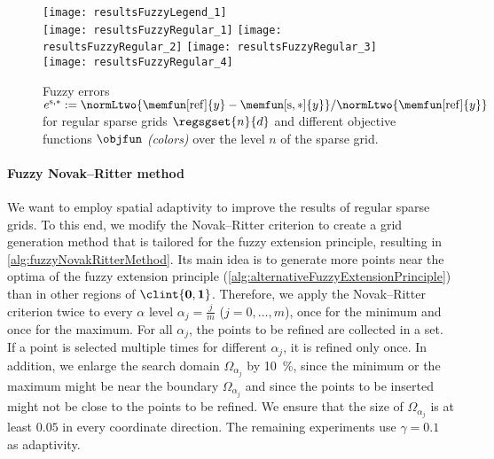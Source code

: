 \begin{figure}
  \texttt{[image: resultsFuzzyLegend\_1]}\\[2mm]%
  \texttt{[image: resultsFuzzyRegular\_1]}%
  \hfill%
  \texttt{[image: resultsFuzzyRegular\_2]}%
  \hfill%
  \texttt{[image: resultsFuzzyRegular\_3]}%
  \hfill%
  \texttt{[image: resultsFuzzyRegular\_4]}%
  \caption[Fuzzy errors for regular sparse grids]{%
    Fuzzy errors
    $e^{\sparse,\ast}
    := \normLtwo{\memfun[\reference]{y} - \memfun[\sparse,\ast]{y}}/
    \normLtwo{\memfun[\reference]{y}}$
    for regular sparse grids $\regsgset{n}{d}$
    and different objective functions $\objfun$ \emph{(colors)}
    over the level $n$ of the sparse grid.%
  }%
  \label{fig:resultsFuzzyRegular}%
\end{figure}

\paragraph{Fuzzy Novak--Ritter method}

We want to employ spatial adaptivity to improve the results
of regular sparse grids.
To this end, we modify the Novak--Ritter criterion
to create a grid generation method that is tailored for the
fuzzy extension principle, resulting in \cref{alg:fuzzyNovakRitterMethod}.
Its main idea is to generate more points near the optima
of the fuzzy extension principle
(\cref{alg:alternativeFuzzyExtensionPrinciple}) than in other regions
of $\clint{\*0, \*1}$.
Therefore, we apply the Novak--Ritter criterion twice to
every $\alpha$ level $\alpha_j = \tfrac{j}{m}$ ($j = 0, \dotsc, m$),
once for the minimum and once for the maximum.
For all $\alpha_j$, the points to be refined are collected in a set.
If a point is selected multiple times for different $\alpha_j$,
it is refined only once.
In addition, we enlarge the search domain $\Omega_{\alpha_j}$
by \SI{10}{\percent}, since the minimum or the maximum might be
near the boundary $\Omega_{\alpha_j}$ and
since the points to be inserted might not be close to
the points to be refined.
We ensure that the size of $\Omega_{\alpha_j}$ is at least $0.05$
in every coordinate direction.
The remaining experiments use $\gamma = 0.1$ as adaptivity.

